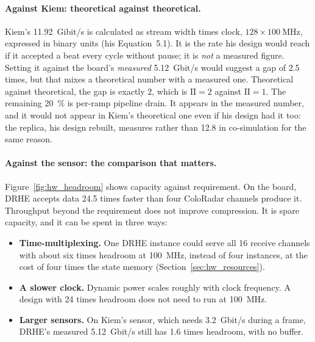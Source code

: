 \paragraph{Against Kiem: theoretical against theoretical.} Kiem's
\SI{11.92}{Gibit/s} is calculated as stream width times clock,
$128 \times \SI{100}{\mega\hertz}$, expressed in binary units (his
Equation~5.1). It is the rate his design would reach if it accepted a beat every
cycle without pause; it is \emph{not} a measured figure. Setting it against the
board's \emph{measured} \SI{5.12}{Gbit/s} would suggest a gap of 2.5 times, but
that mixes a theoretical number with a measured one. Theoretical against
theoretical, the gap is exactly 2, which is $\mathrm{II} = 2$ against
$\mathrm{II} = 1$. The remaining \SI{20}{\percent} is per-ramp pipeline drain.
It appears in the measured number, and it would not appear in Kiem's
theoretical one even if his design had it too: the replica, his design rebuilt,
measures  rather than 12.8 in co-simulation for the same
reason.

\paragraph{Against the sensor: the comparison that matters.}
Figure~\ref{fig:hw_headroom} shows capacity against requirement. On the board,
DRHE accepts data 24.5 times faster than four ColoRadar channels produce it.
Throughput beyond the requirement does not improve compression. It is spare
capacity, and it can be spent in three ways:

\begin{itemize}
\item \textbf{Time-multiplexing.} One DRHE instance could serve all 16
receive channels with about six times headroom at \SI{100}{\mega\hertz},
instead of four instances, at the cost of four times the state memory
(Section~\ref{sec:hw_resources}).
\item \textbf{A slower clock.} Dynamic power scales roughly with clock
frequency. A design with 24 times headroom does not need to run at
\SI{100}{\mega\hertz}.
\item \textbf{Larger sensors.} On Kiem's sensor, which needs
\SI{3.2}{Gbit/s} during a frame, DRHE's measured \SI{5.12}{Gbit/s} still has
1.6 times headroom, with no buffer.
\end{itemize}

